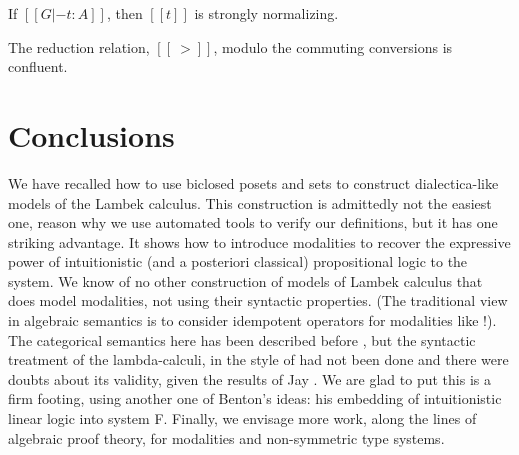 \documentclass{lmcs}
\begin{document}
\begin{thm}
  \label{theorem:strong_normalization_lambdaL!k}
  If $[[G |- t : A]]$, then $[[t]]$ is strongly normalizing.
\end{thm}

\begin{thm}[Confluence]
  \label{thm:confluence-lambdaL!k}
  The reduction relation, $[[~>]]$, modulo the commuting conversions
  is confluent.
\end{thm}


\section{Conclusions}
We have recalled how to use biclosed posets and sets to construct
dialectica-like models of the Lambek calculus. This construction is
admittedly not the easiest one, reason why we use automated tools to
verify our definitions, but it has one striking advantage. It shows
how to introduce modalities to recover the expressive power of
intuitionistic (and a posteriori classical) propositional logic to the
system. We know of no other construction of models of Lambek calculus
that does model modalities, not using their syntactic properties. (The
traditional view in algebraic semantics is to consider idempotent
operators for modalities like !). The categorical semantics here has
been described before \cite{depaiva1991}, but the syntactic treatment
of the lambda-calculi, in the style of \cite{benton1993} had not been
done and there were doubts about its validity, given the results of
Jay \cite{jay1991}. We are glad to put this is a firm footing, using
another one of Benton's ideas: his embedding of intuitionistic linear
logic into system F. Finally, we envisage more work, along the lines
of algebraic proof theory, for modalities and non-symmetric type
systems.



\end{document}
